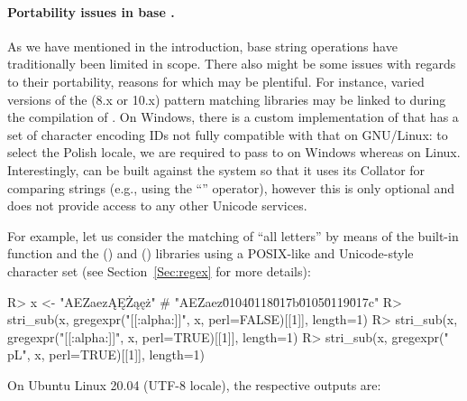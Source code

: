 \documentclass[nojss]{jss}\usepackage[]{graphicx}\usepackage[]{xcolor}
\begin{document}
\paragraph{Portability issues in base .}
As we have mentioned in the introduction,
base  string operations have traditionally been
limited in scope. There also might be some issues with regards to their portability,
reasons for which may be plentiful.
For instance, varied versions of the
 (8.x or 10.x)
pattern matching libraries may be linked to
during the compilation of . On Windows, there is a custom implementation
of  that has a set of character encoding
IDs not fully compatible with that on GNU/Linux: to select
the Polish locale, we are required to pass 
to  on Windows whereas  on
Linux.
Interestingly,  can be built against the system 
so that it uses its Collator for comparing strings (e.g., using the ``\code{<=}''
operator), however this is only optional and does not provide access to any
other Unicode services.























For example, let us consider the matching
of ``all letters'' by means of the built-in  function
and the  ()
and  () libraries
using a POSIX-like and Unicode-style character set
(see Section~\ref{Sec:regex} for more details):

\begin{Schunk}
\begin{Sinput}
R> x <- "AEZaezĄĘŻąęż"  # "AEZaez\u0104\u0118\u017b\u0105\u0119\u017c"
R> stri_sub(x, gregexpr("[[:alpha:]]", x, perl=FALSE)[[1]], length=1)
R> stri_sub(x, gregexpr("[[:alpha:]]", x, perl=TRUE)[[1]],  length=1)
R> stri_sub(x, gregexpr("\\p{L}", x, perl=TRUE)[[1]],       length=1)
\end{Sinput}
\end{Schunk}

On Ubuntu Linux 20.04 (UTF-8 locale), the respective outputs are:
\end{document}
